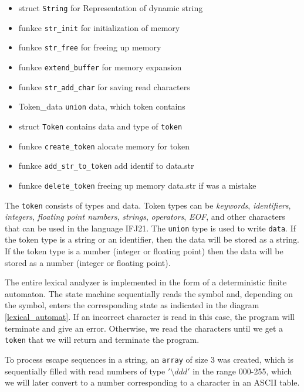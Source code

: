 \documentclass[11pt]{article}
\begin{document}
    \begin{itemize}
        \item struct \texttt{String} for Representation of dynamic string
        \item funkce \texttt{str\_init} for initialization of memory
        \item funkce \texttt{str\_free} for freeing up memory
        \item funkce \texttt{extend\_buffer} for memory expansion
        \item funkce \texttt{str\_add\_char} for saving read characters
        \item Token\_data \texttt{union} data, which token contains
        \item struct \texttt{Token} contains data and type of \texttt{token}
        \item funkce \texttt{create\_token} alocate memory for token
        \item funkce \texttt{add\_str\_to\_token} add identif to data.str
        \item funkce \texttt{delete\_token} freeing up memory data.str if was a mistake
    \end{itemize}
    
The \texttt{token} consists of types and data. Token types can be \textit{keywords}, \textit{identifiers}, \textit{integers}, \textit{floating point numbers}, \textit{strings}, \textit{operators}, \textit{EOF}, and other characters that can be used in the language IFJ21. The \texttt{union} type is used to write \texttt{data}. If the token type is a string or an identifier, then the data will be stored as a string. If the token type is a number (integer or floating point) then the data will be stored as a number (integer or floating point). 

The entire lexical analyzer is implemented in the form of a deterministic finite automaton. The state machine sequentially reads the symbol and, depending on the symbol, enters the corresponding state as indicated in the diagram \ref{lexical_automat}. If an incorrect character is read in this case, the program will terminate and give an error. Otherwise, we read the characters until we get a \texttt{token} that we will return and terminate the program.

To process escape sequences in a string, an \texttt{array} of size 3 was created, which is sequentially filled with read numbers of type $'\setminus{ddd}'$ in the range 000-255, which we will later convert to a number corresponding to a character in an ASCII table.
\end{document}
